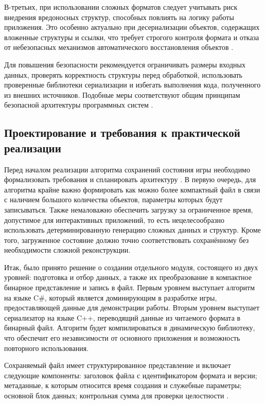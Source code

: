\documentclass[coursework]{SCWorks}
\begin{document}
В-третьих, при использовании сложных форматов следует учитывать риск внедрения вредоносных структур, способных повлиять на логику работы приложения. Это особенно актуально при десериализации объектов, содержащих вложенные структуры и ссылки, что требует строгого контроля формата и отказа от небезопасных механизмов автоматического восстановления объектов \cite{kleppmann2017designing}.

Для повышения безопасности рекомендуется ограничивать размеры входных данных, проверять корректность структуры перед обработкой, использовать проверенные библиотеки сериализации и избегать выполнения кода, полученного из внешних источников. Подобные меры соответствуют общим принципам безопасной архитектуры программных систем \cite{martin2022clean, evans2003domain}.


\subsection{Проектирование и требования к практической реализации}
Перед началом реализации алгоритма сохранений состояния игры необходимо формализовать требования и спланировать архитектуру \cite{kleppmann2017designing}. В первую очередь, для алгоритма крайне важно формировать как можно более компактный файл в связи с наличием большого количества объектов, параметры которых будут записываться. Также немаловажно обеспечить загрузку за ограниченное время, допустимое для интерактивных приложений, то есть нецелесообразно использовать детерминированную генерацию сложных данных и структур. Кроме того, загруженное состояние должно точно соответствовать сохранённому без необходимости сложной реконструкции. 

Итак, было принято решение о создании отдельного модуля, состоящего из двух уровней: подготовка и отбор данных, а также их преобразование в компактное бинарное представление и запись в файл. Первым уровнем выступает  алгоритм на языке C\#, который является доминирующим в разработке игры, предоставляющей данные для демонстрации работы. Вторым уровнем выступает сериализатор на языке C++, переводящий данные из читаемого формата в бинарный файл. Алгоритм будет компилироваться в динамическую библиотеку, что обеспечит его независимости от основного приложения и возможность повторного использования.

Сохраняемый файл имеет структурированное представление и включает следующие компоненты: заголовок файла с идентификатором формата и версии; метаданные, к которым относится время создания и служебные параметры; основной блок данных; контрольная сумма для проверки целостности \cite{tanenbaum2015modern}.  
\end{document}
